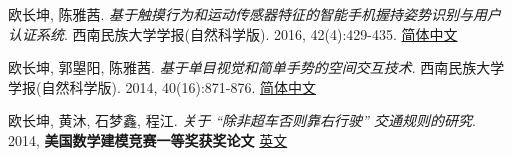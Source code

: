    \item{
       欧长坤, 陈雅茜. 
       \emph{基于触摸行为和运动传感器特征的智能手机握持姿势识别与用户认证系统}. 
       西南民族大学学报(自然科学版). 
       2016, 42(4):429-435. \href{https://changkun.us/files/cv/touch.swun.html}{简体中文}
   }
   \item{
       欧长坤, 郭曌阳, 陈雅茜.
       \emph{基于单目视觉和简单手势的空间交互技术}. 
       西南民族大学学报(自然科学版). 
       2014, 40(16):871-876. \href{https://changkun.us/files/cv/vision.swun.html}{简体中文}
   }
   \item{
       欧长坤, 黄沐, 石梦鑫, 程江.
       \emph{关于 ``除非超车否则靠右行驶'' 交通规则的研究}. 
       2014, \textbf{美国数学建模竞赛一等奖获奖论文} \href{https://changkun.us/files/cv/28922.public.html}{英文}
   }
 \resumeSubHeadingListEnd